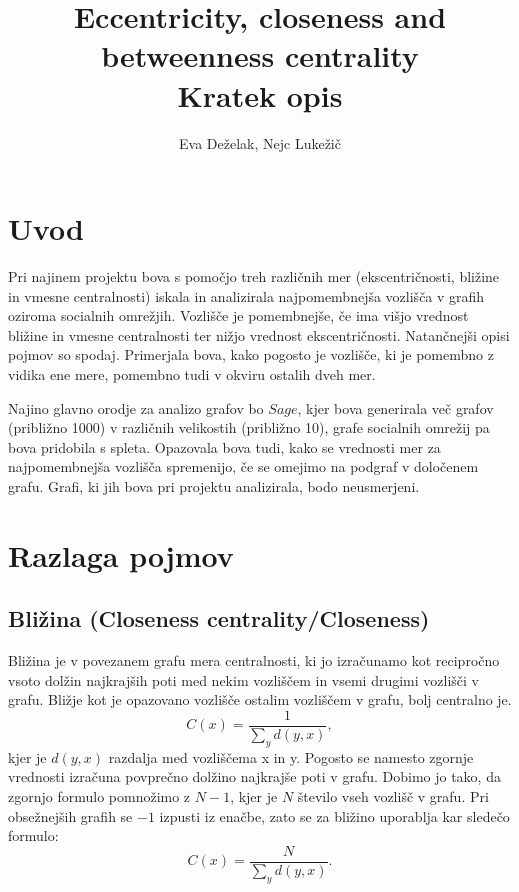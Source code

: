 \documentclass[12pt,a4paper]{amsart}
\begin{document}
\title{Eccentricity, closeness and betweenness centrality \\
\small Kratek opis}

\author{Eva Deželak, Nejc Lukežič}
\maketitle

\section{Uvod}
Pri najinem projektu bova s pomočjo treh različnih mer (ekscentričnosti, bližine in vmesne centralnosti) iskala in analizirala najpomembnejša vozlišča v grafih oziroma socialnih omrežjih. Vozlišče je pomembnejše, če ima višjo vrednost bližine in vmesne centralnosti ter nižjo vrednost ekscentričnosti. Natančnejši opisi pojmov so spodaj. Primerjala bova, kako pogosto je vozlišče, ki je pomembno z vidika ene mere, pomembno tudi v okviru ostalih dveh mer.

Najino glavno orodje za analizo grafov bo $Sage$, kjer bova generirala več grafov (približno 1000) v različnih velikostih (približno 10), grafe socialnih omrežij pa bova pridobila s spleta. Opazovala bova tudi, kako se vrednosti mer za najpomembnejša vozlišča spremenijo, če se omejimo na podgraf v določenem grafu. Grafi, ki jih bova pri projektu analizirala, bodo neusmerjeni.

\section{Razlaga pojmov}

\subsection{Bližina (Closeness centrality/Closeness)}

Bližina je v povezanem grafu mera centralnosti, ki jo izračunamo kot recipročno vsoto dolžin najkrajših poti med nekim vozliščem in vsemi drugimi vozlišči v grafu. Bližje kot je opazovano vozlišče ostalim vozliščem v grafu, bolj centralno je.
$$C(x) = \frac{1}{\sum_{y}^{} d(y,x)}, $$
kjer je $d(y, x)$ razdalja med vozliščema x in y. 
Pogosto se namesto zgornje vrednosti izračuna povprečno dolžino najkrajše poti v grafu. Dobimo jo tako, da zgornjo formulo pomnožimo z $N-1$, kjer je $N$ število vseh vozlišč v grafu. Pri obsežnejših grafih se $-1$ izpusti iz enačbe, zato se za bližino uporablja kar sledečo formulo:
$$C(x) = \frac{N}{\sum_{y}^{} d(y,x)}.$$
\end{document}
